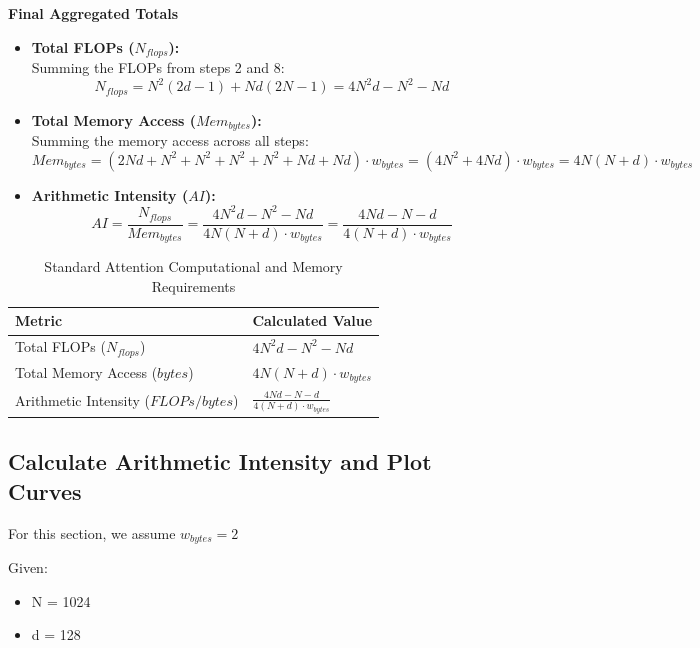 \documentclass{article}
\begin{document}
\newpage
\textbf{Final Aggregated Totals}

\begin{itemize}
    \item \textbf{Total FLOPs ($N_{flops}$):} \\
    Summing the FLOPs from steps 2 and 8: 
    $$N_{flops} = N^2(2d - 1) + Nd(2N - 1) = 4N^2d - N^2 - Nd$$
    
    \item \textbf{Total Memory Access ($Mem_{bytes}$):} \\
    Summing the memory access across all steps:
    $$Mem_{bytes} = (2Nd + N^2 + N^2 + N^2 + N^2 + Nd + Nd) \cdot w_{bytes} = (4N^2 + 4Nd) \cdot w_{bytes} = 4N(N + d) \cdot w_{bytes}$$
    
    \item \textbf{Arithmetic Intensity ($AI$):}
    $$AI = \frac{N_{flops}}{Mem_{bytes}} = \frac{4N^2d - N^2 - Nd}{4N(N + d) \cdot w_{bytes}} = \frac{4Nd - N - d}{4(N + d) \cdot w_{bytes}}$$
\end{itemize}

\vspace{1.0em}
\begin{table}[h]
\centering
\renewcommand{\arraystretch}{2.2}
\begin{tabular}{|l|l|}
\hline
\textbf{Metric} & \textbf{Calculated Value} \\ \hline
Total FLOPs ($N_{flops}$) & $4N^2d - N^2 - Nd$ \\ \hline
Total Memory Access (${bytes}$) & $4N(N + d) \cdot w_{bytes}$ \\ \hline
Arithmetic Intensity (${FLOPs}/{bytes}$) & $\displaystyle \frac{4Nd - N - d}{4(N + d) \cdot w_{bytes}}$ \\ \hline
\end{tabular}
\caption{Standard Attention Computational and Memory Requirements}
\end{table}

\subsection{Calculate Arithmetic Intensity and Plot Curves}
For this section, we assume $w_{bytes} = 2$

\vspace{1.3em}

Given:
\begin{itemize}
    \item N = 1024
    \item d = 128
\end{itemize}
\end{document}
